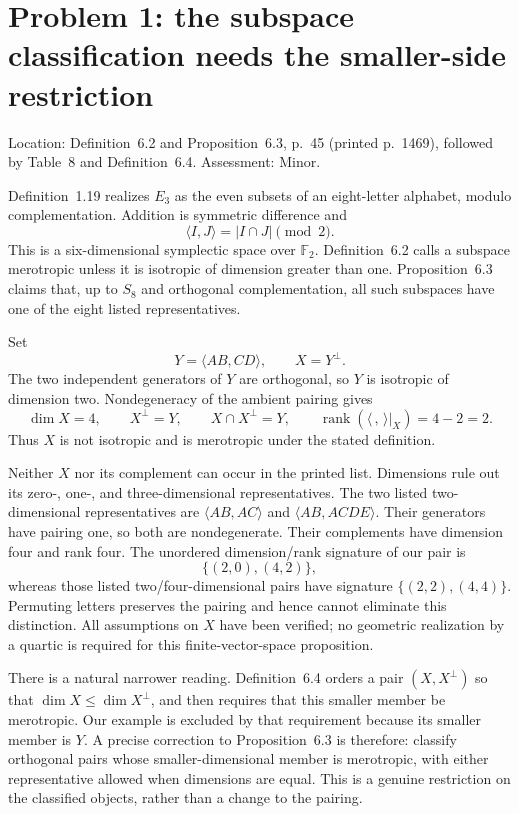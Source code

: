 \documentclass[10pt]{article}
\begin{document}
\section*{Problem 1: the subspace classification needs the smaller-side restriction}
Location: Definition 6.2 and Proposition 6.3, p. 45 (printed p. 1469), followed by Table 8 and Definition 6.4. Assessment: Minor.\par
Definition 1.19 realizes \(E_3\) as the even subsets of an eight-letter alphabet, modulo complementation. Addition is symmetric difference and \[\langle I,J\rangle=|I\cap J|\pmod2.\] This is a six-dimensional symplectic space over \(\mathbb F_2\). Definition 6.2 calls a subspace merotropic unless it is isotropic of dimension greater than one. Proposition 6.3 claims that, up to \(S_8\) and orthogonal complementation, all such subspaces have one of the eight listed representatives.\par
Set \[Y=\langle AB,CD\rangle,\qquad X=Y^\perp.\] The two independent generators of \(Y\) are orthogonal, so \(Y\) is isotropic of dimension two. Nondegeneracy of the ambient pairing gives \[\dim X=4,\qquad X^\perp=Y,\qquad
 X\cap X^\perp=Y,\qquad
 \operatorname{rank}(\langle\, ,\,\rangle|_X)=4-2=2.\] Thus \(X\) is not isotropic and is merotropic under the stated definition.\par
Neither \(X\) nor its complement can occur in the printed list. Dimensions rule out its zero-, one-, and three-dimensional representatives. The two listed two-dimensional representatives are \(\langle AB,AC\rangle\) and \(\langle AB,ACDE\rangle\). Their generators have pairing one, so both are nondegenerate. Their complements have dimension four and rank four. The unordered dimension/rank signature of our pair is \[\{(2,0),(4,2)\},\] whereas those listed two/four-dimensional pairs have signature \(\{(2,2),(4,4)\}\). Permuting letters preserves the pairing and hence cannot eliminate this distinction. All assumptions on \(X\) have been verified; no geometric realization by a quartic is required for this finite-vector-space proposition.\par
There is a natural narrower reading. Definition 6.4 orders a pair \((X,X^\perp)\) so that \(\dim X\le\dim X^\perp\), and then requires that this smaller member be merotropic. Our example is excluded by that requirement because its smaller member is \(Y\). A precise correction to Proposition 6.3 is therefore: classify orthogonal pairs whose smaller-dimensional member is merotropic, with either representative allowed when dimensions are equal. This is a genuine restriction on the classified objects, rather than a change to the pairing.\par
\end{document}
